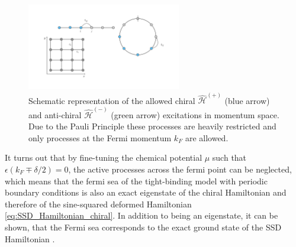 \documentclass[11pt, a4paper]{article}
\theoremstyle{definition} %
\begin{document}
\begin{figure}[h]
	\centering
	\includegraphics[width=0.6\textwidth]{SSD_Construction}
	\caption{Schematic representation of the allowed chiral $\hat{\mathcal{H}}^{(+)}$ (blue arrow) and anti-chiral $\hat{\mathcal{H}}^{(-)}$ (green arrow) excitations in momentum space. Due to the Pauli Principle these processes are heavily restricted and only processes at the Fermi momentum $k_F$ are allowed.}
\end{figure}

It turns out that by fine-tuning the chemical potential $\mu$ such that $\epsilon(k_F \mp \delta/2) = 0$, the active processes across the fermi point can be neglected, which means that the fermi sea of the tight-binding model with periodic boundary conditions is also an exact eigenstate of the chiral Hamiltonian and therefore of the sine-squared deformed Hamiltonian \ref{eq:SSD_Hamiltonian_chiral}. In addition to being an eigenstate, it can be shown, that the Fermi sea corresponds to the exact ground state of the SSD Hamiltonian \cite{Katsura} \cite{Maruyama}.
\end{document}
